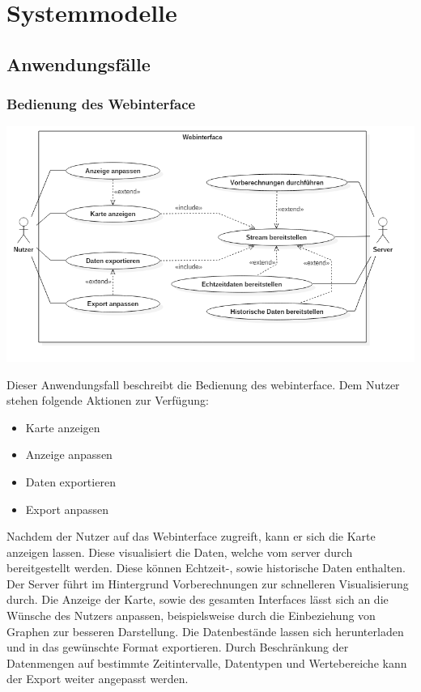 \chapter{Systemmodelle}

\section{Anwendungsfälle}
    \subsection{Bedienung des Webinterface}
        \includegraphics[width=1\linewidth]{diagrams/UseCaseDiagram1.png}
       
       Dieser Anwendungsfall beschreibt die Bedienung des \gls{webinterface}. Dem Nutzer stehen folgende Aktionen zur Verfügung:
       \begin{itemize}
            \item Karte anzeigen
            \item Anzeige anpassen
            \item Daten exportieren
            \item Export anpassen
        \end{itemize}
        Nachdem der Nutzer auf das Webinterface zugreift, kann er sich die Karte anzeigen lassen. Diese visualisiert die Daten, welche vom \gls{server} durch  bereitgestellt werden. Diese können Echtzeit-, sowie historische Daten enthalten. Der Server führt im Hintergrund Vorberechnungen zur schnelleren Visualisierung durch. Die Anzeige der Karte, sowie des gesamten Interfaces lässt sich an die Wünsche des Nutzers anpassen, beispielsweise durch die Einbeziehung von Graphen zur besseren Darstellung. Die Datenbestände lassen sich herunterladen und in das gewünschte Format exportieren. Durch Beschränkung der Datenmengen auf bestimmte Zeitintervalle, Datentypen und Wertebereiche kann der Export weiter angepasst werden.
        

